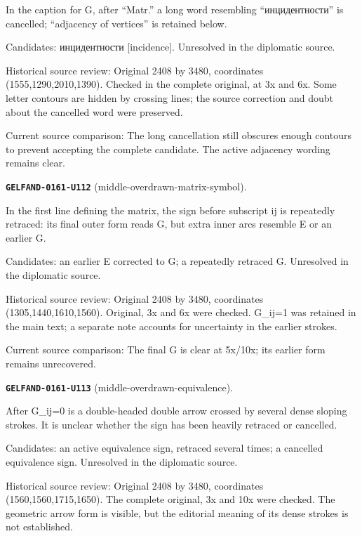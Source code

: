 In the caption for G, after “Matr.” a long word resembling “инцидентности” is cancelled; “adjacency of vertices” is retained below.\par
Candidates: инцидентности [incidence]. Unresolved in the diplomatic source.\par
Historical source review: Original 2408 by 3480, coordinates (1555,1290,2010,1390). Checked in the complete original, at 3x and 6x. Some letter contours are hidden by crossing lines; the source correction and doubt about the cancelled word were preserved.\par
Current source comparison: The long cancellation still obscures enough contours to prevent accepting the complete candidate. The active adjacency wording remains clear.\par\medskip
\par\noindent\leavevmode{}\label{GELFAND-0161-U112}\label{GELFAND-P001488:middle-overdrawn-matrix-symbol}\textbf{\texttt{GELFAND-0161-U112}} (middle-overdrawn-matrix-symbol).\nopagebreak[4]\par
In the first line defining the matrix, the sign before subscript ij is repeatedly retraced: its final outer form reads G, but extra inner arcs resemble E or an earlier G.\par
Candidates: an earlier E corrected to G; a repeatedly retraced G. Unresolved in the diplomatic source.\par
Historical source review: Original 2408 by 3480, coordinates (1305,1440,1610,1560). Original, 3x and 6x were checked. G\_ij=1 was retained in the main text; a separate note accounts for uncertainty in the earlier strokes.\par
Current source comparison: The final G is clear at 5x/10x; its earlier form remains unrecovered.\par\medskip
\par\noindent\leavevmode{}\label{GELFAND-0161-U113}\label{GELFAND-P001488:middle-overdrawn-equivalence}\textbf{\texttt{GELFAND-0161-U113}} (middle-overdrawn-equivalence).\nopagebreak[4]\par
After G\_ij=0 is a double-headed double arrow crossed by several dense sloping strokes. It is unclear whether the sign has been heavily retraced or cancelled.\par
Candidates: an active equivalence sign, retraced several times; a cancelled equivalence sign. Unresolved in the diplomatic source.\par
Historical source review: Original 2408 by 3480, coordinates (1560,1560,1715,1650). The complete original, 3x and 10x were checked. The geometric arrow form is visible, but the editorial meaning of its dense strokes is not established.\par
